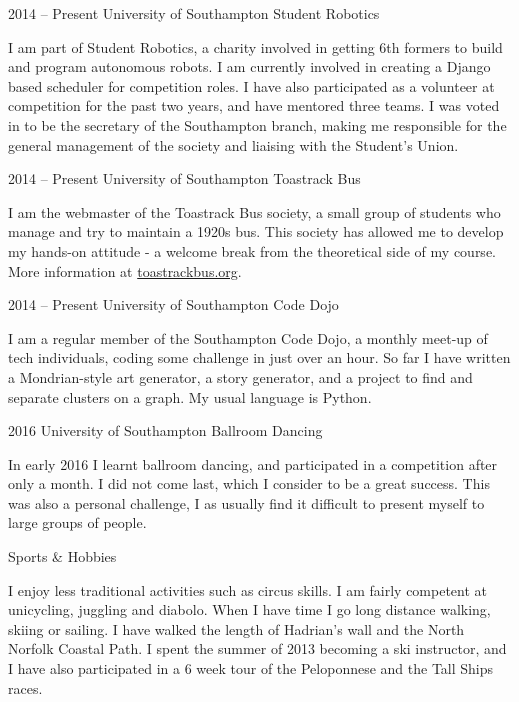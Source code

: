 \documentclass{tccv}
\begin{document}
\begin{eventlist}

    \item{2014 -- Present}
         {University of Southampton}
         {Student Robotics}

    I am part of Student Robotics, a charity involved in getting 6th formers to build and program autonomous robots. I am currently involved in creating a Django based scheduler for competition roles. I have also participated as a volunteer at competition for the past two years, and have mentored three teams. I was voted in to be the secretary of the Southampton branch, making me responsible for the general management of the society and liaising with the Student's Union.

    \item{2014 -- Present}
         {University of Southampton}
         {Toastrack Bus}

    I am the webmaster of the Toastrack Bus society, a small group of students who manage and try to maintain a 1920s bus. This society has allowed me to develop my hands-on attitude - a welcome break from the theoretical side of my course. More information at \href{http://toastrackbus.org}{toastrackbus.org}.

    \item{2014 -- Present}
         {University of Southampton}
         {Code Dojo}

    I am a regular member of the Southampton Code Dojo, a monthly meet-up of tech individuals, coding some challenge in just over an hour. So far I have written a Mondrian-style art generator, a story generator, and a project to find and separate clusters on a graph. My usual language is Python.

    \item{2016}
         {University of Southampton}
         {Ballroom Dancing}

    In early 2016 I learnt ballroom dancing, and participated in a competition after only a month. I did not come last, which I consider to be a great success. This was also a personal challenge, I as usually find it difficult to present myself to large groups of people.


    \item{}
         {}
         {Sports \& Hobbies}

    I enjoy less traditional activities such as circus skills. I am fairly competent at unicycling, juggling and diabolo. When I have time I go long distance walking, skiing or sailing. I have walked the length of Hadrian's wall and the North Norfolk Coastal Path. I spent the summer of 2013 becoming a ski instructor, and I have also participated in a 6 week tour of the Peloponnese and the Tall Ships races.

\end{eventlist}
\end{document}
